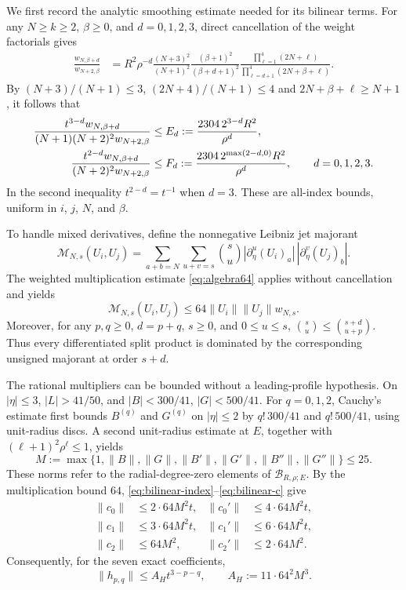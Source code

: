 We first record the analytic smoothing estimate needed for its bilinear terms. For any $N\ge k\ge2$, $\beta\ge0$, and $d=0,1,2,3$, direct cancellation of the weight factorials gives
\begin{align}\label{eq:bilinear-weight-identity}
 \frac{w_{N,\beta+d}}{w_{N+2,\beta}}
 &=R^2\rho^{-d}\frac{(N+3)^2}{(N+1)^2}
  \frac{(\beta+1)^2}{(\beta+d+1)^2}
  \frac{\prod_{\ell=1}^{4}(2N+\ell)}
       {\prod_{\ell=d+1}^{4}(2N+\beta+\ell)}.
\end{align}
By $(N+3)/(N+1)\le3$, $(2N+4)/(N+1)\le4$ and $2N+\beta+\ell\ge N+1$, it follows that
\begin{align}\label{eq:bilinear-smoothing-bounds}
 \frac{t^{3-d}w_{N,\beta+d}}
 {(N+1)(N+2)^2w_{N+2,\beta}}
 &\le E_d:=\frac{2304\,2^{3-d}R^2}{\rho^d},\\
 \frac{t^{2-d}w_{N,\beta+d}}
 {(N+2)^2w_{N+2,\beta}}
 &\le F_d:=\frac{2304\,2^{\max(2-d,0)}R^2}{\rho^d},
 \qquad d=0,1,2,3.\notag
\end{align}
In the second inequality $t^{2-d}=t^{-1}$ when $d=3$. These are all-index bounds, uniform in $i$, $j$, $N$, and $\beta$.

To handle mixed derivatives, define the nonnegative Leibniz jet majorant
\[
 \mathcal M_{N,s}(U_i,U_j)=
 \sum_{a+b=N}\sum_{u+v=s}\binom{s}{u}
 |\partial_\eta^u(U_i)_a|\,|\partial_\eta^v(U_j)_b|.
\]
The weighted multiplication estimate \eqref{eq:algebra64} applies without cancellation and yields
\begin{equation}\label{eq:bilinear-unsigned}
 \mathcal M_{N,s}(U_i,U_j)
 \le64\|U_i\|\|U_j\|w_{N,s}.
\end{equation}
Moreover, for any $p,q\ge0$, $d=p+q$, $s\ge0$, and $0\le u\le s$,
$\binom{s}{u}\le\binom{s+d}{u+p}$. Thus every differentiated split product is dominated by the corresponding unsigned majorant at order $s+d$.

The rational multipliers can be bounded without a leading-profile hypothesis. On $|\eta|\le3$, $|L|>41/50$, and $|B|<300/41$, $|G|<500/41$. For $q=0,1,2$, Cauchy's estimate first bounds $B^{(q)}$ and $G^{(q)}$ on $|\eta|\le2$ by $q!\,300/41$ and $q!\,500/41$, using unit-radius discs. A second unit-radius estimate at $E$, together with $(\ell+1)^2\rho^\ell\le1$, yields
\begin{equation}\label{eq:bilinear-multiplier-M}
 M:=\max\{1,\|B\|,\|G\|,\|B'\|,\|G'\|,
 \|B''\|,\|G''\|\}\le25.
\end{equation}
These norms refer to the radial-degree-zero elements of $\mathcal B_{R,\rho;E}$. By the multiplication bound $64$, \eqref{eq:bilinear-index}--\eqref{eq:bilinear-c} give
\begin{align*}
 \|c_0\|&\le2\cdot64M^2t,& \|c_0'\|&\le4\cdot64M^2t,\\
 \|c_1\|&\le3\cdot64M^2t,& \|c_1'\|&\le6\cdot64M^2t,\\
 \|c_2\|&\le64M^2,& \|c_2'\|&\le2\cdot64M^2.
\end{align*}
Consequently, for the seven exact coefficients,
\begin{equation}\label{eq:bilinear-H-normalform-bound}
 \|h_{p,q}\|\le A_H t^{3-p-q},
 \qquad A_H:=11\cdot64^2 M^3.
\end{equation}

